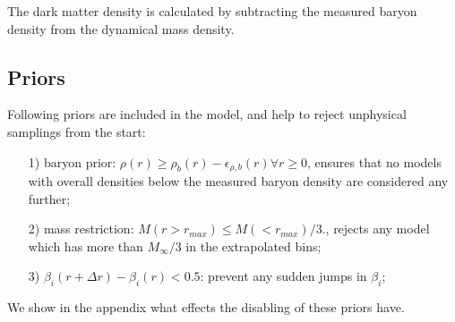 The dark matter density is calculated by subtracting the measured
baryon density from the dynamical mass density.

\subsection{Priors}
Following priors are included in the model, and help to reject
unphysical samplings from the start:

\begin{enumerate}
    \item[1)] baryon prior: $\rho(r) \geq
    \rho_b(r)-\epsilon_{\rho,b}(r) \forall r\geq0$, ensures that no
    models with overall densities below the measured baryon density
    are considered any further;

\item[2)] mass restriction: $M(r>r_{max}) \leq M(<r_{max})/3.$, rejects any
  model which has more than $M_\infty/3$ in the extrapolated bins;

\item[3)] $\beta_i(r+\Delta r)-\beta_i(r) < 0.5$: prevent any sudden
  jumps in $\beta_i$;
\end{enumerate}

We show in the appendix what effects the disabling of these priors
have.
